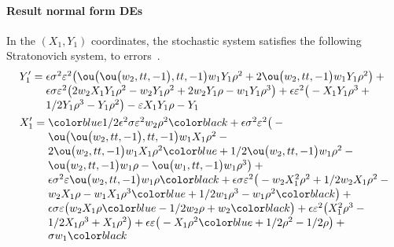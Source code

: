 \paragraph{Result normal form DEs}
In the \((X_1,Y_1)\) coordinates, the stochastic system
satisfies the following Stratonovich system, to
errors~.
\begin{align*}&
\dash Y_{1}=\ParMath{ \epsilon  \sigma ^{2} \eps^{2} \big(\ou\big(\ou\big(w_{2},tt,
-1\big),tt,-1\big) w_{1} Y_{1} \rho ^{2}+2 \ou\big(w_{2},tt,-1\big) w_{1
} Y_{1} \rho ^{2}\big)+\epsilon  \sigma  \eps^{2} \big(2 w_{2} X_{1} Y_{
1} \rho ^{2}-w_{2} Y_{1} \rho ^{2}+2 w_{2} Y_{1} \rho -w_{1} Y_{1} \rho 
^{3}\big)+\epsilon  \eps^{2} \big(-X_{1} Y_{1} \rho ^{3}+1/2 Y_{1} \rho 
^{3}-Y_{1} \rho ^{2}\big)-\eps X_{1} Y_{1} \rho -Y_{1}
}\\&
\dash X_{1}=\ParMath{ \b{1/2 \epsilon ^{2} \sigma  \eps^{2} w_{2} \rho ^{2}}
+\epsilon \sigma ^{2} \eps^{2} \big(-\ou\big(\ou\big(w_{2},tt,-1\big),tt,-1\big) w
_{1} X_{1} \rho ^{2}-2 \ou\big(w_{2},tt,-1\big) w_{1} X_{1} \rho ^{2}
\b{+1/2 \ou\big(w_{2},tt,-1\big) w_{1} \rho ^{2}-\ou\big(w_{2},tt,-1\big) w_{1} \rho -\ou\big(w_{1},tt,-1\big) w_{1} \rho ^{3}\big)+\epsilon  \sigma ^{2} \eps \ou\big(w_{2},tt,-1\big) w_{1} \rho}
+\epsilon  \sigma  \eps^{2} \big(-w_{2} X_{1}^{2} \rho ^{2}+1/2 w_{2} X_{1} \rho ^{2}-w_{2} X_{1} 
\rho -w_{1} X_{1} \rho ^{3}
\b{+1/2 w_{1} \rho ^{3}-w_{1} \rho ^{2}}\big)+
\epsilon  \sigma  \eps \big(w_{2} X_{1} \rho 
\b{-1/2 w_{2} \rho +w_{2}}\big)
+\epsilon  \eps^{2} \big(X_{1}^{2} \rho ^{3}-1/2 X_{1} \rho ^{3}+X_{1} 
\rho ^{2}\big)+\epsilon  \eps \big(-X_{1} \rho ^{2}
\b{+1/2 \rho ^{2}-1/2 
\rho \big)+\sigma  w_{1}}
}
\end{align*}

